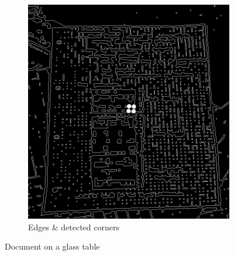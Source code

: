 \documentclass{scrartcl}
\begin{document}
\begin{figure}[!htbp]
\begin{subfigure}[b]{0.3\textwidth}
      \includegraphics[width=\textwidth]{pictures/results/glass/edge-detector.png}
      \caption{Edges \& detected corners}
    \end{subfigure}
    \caption{Document on a glass table}
    \label{figure:document-on-glass-table}
  \end{figure}
\end{document}
